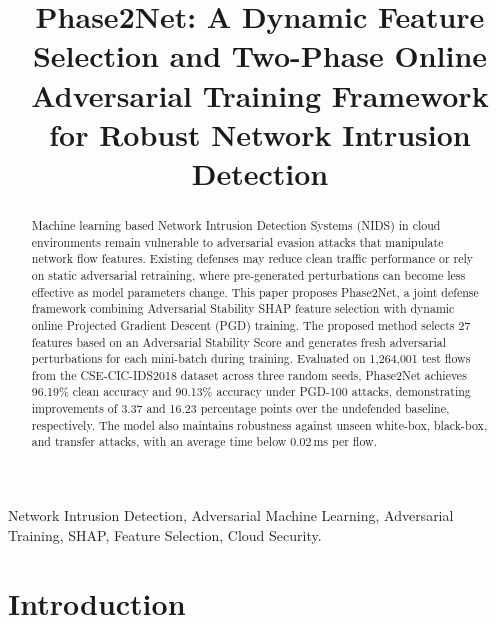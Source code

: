 \documentclass[conference]{IEEEtran}
\begin{document}
\title{Phase2Net: A Dynamic Feature Selection and Two-Phase Online Adversarial Training Framework for Robust Network Intrusion Detection}
\author{}
\maketitle

\begin{abstract}
Machine learning based Network Intrusion Detection Systems (NIDS) in cloud environments remain vulnerable to adversarial evasion attacks that manipulate network flow features. Existing defenses may reduce clean traffic performance or rely on static adversarial retraining, where pre-generated perturbations can become less effective as model parameters change. This paper proposes Phase2Net, a joint defense framework combining Adversarial Stability SHAP feature selection with dynamic online Projected Gradient Descent (PGD) training. The proposed method selects 27 features based on an Adversarial Stability Score and generates fresh adversarial perturbations for each mini-batch during training. Evaluated on 1,264,001 test flows from the CSE-CIC-IDS2018 dataset across three random seeds, Phase2Net achieves 96.19\% clean accuracy and 90.13\% accuracy under PGD-100 attacks, demonstrating improvements of 3.37 and 16.23 percentage points over the undefended baseline, respectively. The model also maintains robustness against unseen white-box, black-box, and transfer attacks, with an average time below 0.02\,ms per flow.
\end{abstract}

\begin{IEEEkeywords}
Network Intrusion Detection, Adversarial Machine Learning, Adversarial Training, SHAP, Feature Selection, Cloud Security.
\end{IEEEkeywords}

\section{Introduction}
\end{document}
